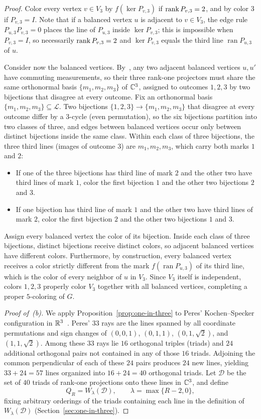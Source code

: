 \begin{proof}
Color every vertex $v\in V_3$ by $f(\ker P_{v,3})$ if $\operatorname{rank} P_{v,3}=2$, and by color $3$ if $P_{v,3}=I$. Note that if a balanced vertex $u$ is adjacent to $v\in V_3$, the edge rule $P_{u,3}P_{v,3}=0$ places the line of $P_{u,3}$ inside $\ker P_{v,3}$; this is impossible when $P_{v,3}=I$, so necessarily $\operatorname{rank} P_{v,3}=2$ and $\ker P_{v,3}$ equals the third line $\operatorname{ran} P_{u,3}$ of $u$.

Consider now the balanced vertices. By~\cite[Lemma~2]{Ji}, any two adjacent balanced vertices $u,u'$ have commuting measurements, so their three rank-one projectors must share the same orthonormal basis $\{m_1,m_2,m_3\}$ of $\mathbb C^3$, assigned to outcomes $1,2,3$ by two bijections that disagree at every outcome. Fix an orthonormal basis $\{m_1,m_2,m_3\}\subseteq\mathcal L$. Two bijections $\{1,2,3\}\to\{m_1,m_2,m_3\}$ that disagree at every outcome differ by a $3$-cycle (even permutation), so the six bijections partition into two classes of three, and edges between balanced vertices occur only between distinct bijections inside the same class. Within each class of three bijections, the three third lines (images of outcome $3$) are $m_1,m_2,m_3$, which carry both marks $1$ and $2$:
\begin{itemize}
\item If one of the three bijections has third line of mark $2$ and the other two have third lines of mark $1$, color the first bijection $1$ and the other two bijections $2$ and $3$.
\item If one bijection has third line of mark $1$ and the other two have third lines of mark $2$, color the first bijection $2$ and the other two bijections $1$ and $3$.
\end{itemize}
Assign every balanced vertex the color of its bijection. Inside each class of three bijections, distinct bijections receive distinct colors, so adjacent balanced vertices have different colors. Furthermore, by construction, every balanced vertex receives a color strictly different from the mark $f(\operatorname{ran} P_{u,3})$ of its third line, which is the color of every neighbor of $u$ in $V_3$. Since $V_3$ itself is independent, colors $1,2,3$ properly color $V_3$ together with all balanced vertices, completing a proper $5$-coloring of $G$.

\emph{Proof of~(b).} We apply Proposition~\ref{prop:one-in-three} to Peres' Kochen--Specker configuration in $\mathbb R^3$~\cite{Peres91}. Peres' $33$ rays are the lines spanned by all coordinate permutations and sign changes of $(0,0,1)$, $(0,1,1)$, $(0,1,\sqrt2)$, and $(1,1,\sqrt2)$. Among these $33$ rays lie $16$ orthogonal triples (triads) and $24$ additional orthogonal pairs not contained in any of those $16$ triads. Adjoining the common perpendicular of each of these $24$ pairs produces $24$ new lines, yielding $33+24=57$ lines organized into $16+24=40$ orthogonal triads. Let $\mathcal D$ be the set of $40$ triads of rank-one projections onto these lines in $\mathbb C^3$, and define
\[
 Q_R=W_\lambda(\mathcal D),\qquad \lambda=\max\{R-2,0\},
\]
fixing arbitrary orderings of the triads containing each line in the definition of $W_\lambda(\mathcal D)$ (Section~\ref{sec:one-in-three}).


\end{proof}
